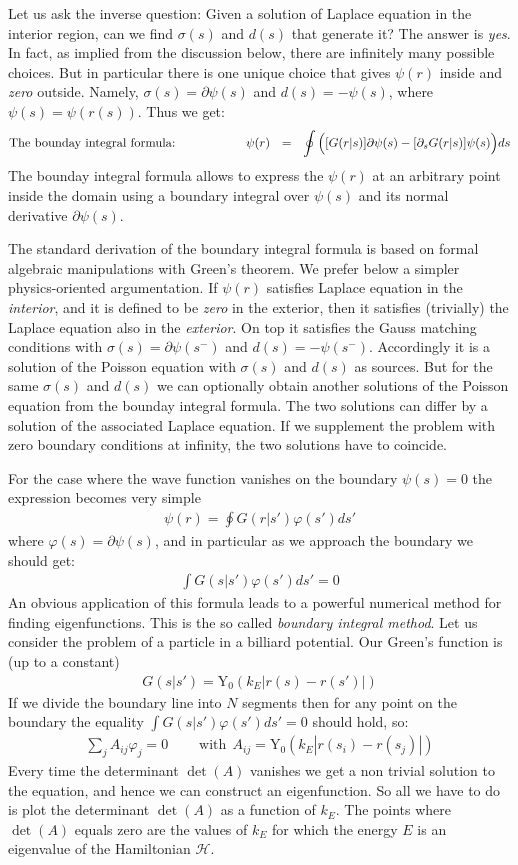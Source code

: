 \documentclass[onecolumn,fleqn, 11pt]{revtex4}
\newcommand{\beq}{\begin{eqnarray}}
\newcommand{\eeq}{\end{eqnarray}}
\begin{document}
Let us ask the inverse question: 
Given a solution of Laplace equation 
in the interior region, can we find $\sigma(s)$ 
and $d(s)$ that generate it? The answer is {\em yes}. 
In fact, as implied from the discussion below, 
there are infinitely many possible choices. 
But in particular there is one unique choice that 
gives $\psi(r)$ inside and {\em zero} outside.
Namely, ${\sigma(s)=\partial \psi(s)}$ and ${d(s)=-\psi(s)}$, 
where $\psi(s) = \psi(r(s))$. Thus we get: 
\beq
\mbox{The bounday integral formula:} 
\hspace*{2cm} 
\psi(r) \ \ = \ \ 
\oint \Big( [G(r|s)] \partial\psi(s) - [\partial_s G(r|s)] \psi(s) \Big) ds
\eeq
The bounday integral formula allows to express the $\psi(r)$ 
at an arbitrary point inside the domain 
using a boundary integral over $\psi(s)$ 
and its normal derivative $\partial \psi(s)$.


The standard derivation of the boundary integral formula
is based on formal algebraic manipulations with Green's theorem. 
We prefer below a simpler physics-oriented argumentation. 
If $\psi(r)$ satisfies Laplace equation in the {\em interior},  
and it is defined to be {\em zero} in the exterior, 
then it satisfies (trivially) the Laplace equation also 
in the {\em exterior}. On top it satisfies the Gauss matching 
conditions with ${\sigma(s)=\partial \psi(s^{-})}$ and ${d(s)=-\psi(s^{-})}$. 
Accordingly it is a solution of the Poisson equation
with $\sigma(s)$ and $d(s)$ as sources. 
But for the same $\sigma(s)$ and $d(s)$ we can optionally 
obtain another solutions of the Poisson equation
from the bounday integral formula. 
The two solutions can differ by 
a solution of the associated Laplace equation.  
If we supplement the problem with zero boundary conditions 
at infinity, the two solutions have to coincide.  



For the case where the wave function vanishes 
on the boundary $\psi(s)=0$
the expression becomes very simple
\beq
\psi(r) = \oint G(r|s') \varphi(s') ds'
\eeq
where $\varphi(s)=\partial\psi(s)$, 
and in particular as we approach 
the boundary we should get: 
\beq
\int G(s|s')\varphi(s')ds' = 0
\eeq
An obvious application of this formula 
leads to a powerful numerical method 
for finding eigenfunctions. This is 
the so called \textit{boundary integral method}.
Let us consider the problem of a
particle in a billiard potential. 
Our Green's function is (up to a constant) 
\beq
G(s|s')=\mathrm{Y_0}(k_E|r(s)-r(s')|)
\eeq
If we divide the boundary line into $N$ segments 
then for any point on the boundary the 
equality $\int G(s|s')\varphi(s')ds' = 0$ should hold, so:
\beq
\sum_j A_{ij} \varphi_j = 0
\ \ \ \ \ \ \ \ \ \ \mbox{with} \ \ 
A_{ij} = \mathrm{Y_0}(k_E|r(s_i)-r(s_j)|) 
\eeq
Every time the determinant $\det(A)$
vanishes we get a non trivial solution 
to the equation, and hence we can construct 
an eigenfunction. So all we have to do is 
plot the determinant $\det(A)$ as a function of $k_E$. 
The points where $\det(A)$ equals zero are the values of $k_E$
for which the energy $E$ is an eigenvalue of the Hamiltonian $\mathcal{H}$.
\end{document}
